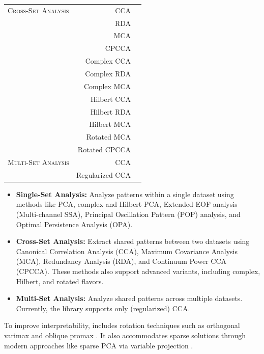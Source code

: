 \begin{table}[t!]
\begin{tabular}{l r c}
        \midrule
        \textsc{Cross-Set Analysis} & CCA & \cite{hotelling_relations_1936,bretherton_intercomparison_1992}  \\ 
        & RDA & \cite{storch_statistical_1999}  \\ 
        & MCA & \cite{bretherton_intercomparison_1992,storch_statistical_1999}  \\ 
        & CPCCA & \cite{swenson_continuum_2015}  \\ 
        & Complex CCA &   \\ 
        & Complex RDA &   \\ 
        & Complex MCA &   \\ 
        & Hilbert CCA &   \\ 
        & Hilbert RDA &   \\ 
        & Hilbert MCA & \cite{elipot_observed_2017}  \\ 
        & Rotated MCA & \cite{cheng_orthogonal_1995}  \\
        & Rotated CPCCA &   \\
        \midrule
        \textsc{Multi-Set Analysis} & CCA & \cite{kettenring_canonical_1971}  \\ 
        & Regularized CCA & \cite{vinod_canonical_1976}  \\ 
        \bottomrule
    \end{tabular}
\end{table}

\begin{itemize}
    \item \textbf{Single-Set Analysis:} Analyze patterns within a single dataset using methods like PCA, complex and Hilbert PCA, Extended EOF analysis (Multi-channel SSA), Principal Oscillation Pattern (POP) analysis, and Optimal Persistence Analysis (OPA).
    \item \textbf{Cross-Set Analysis:} Extract shared patterns between two datasets using Canonical Correlation Analysis (CCA), Maximum Covariance Analysis (MCA), Redundancy Analysis (RDA), and Continuum Power CCA (CPCCA). These methods also support advanced variants, including complex, Hilbert, and rotated flavors.
    \item \textbf{Multi-Set Analysis:} Analyze shared patterns across multiple datasets. Currently, the library supports only (regularized) CCA.
\end{itemize}

To improve interpretability,  includes rotation techniques such as orthogonal varimax \cite{kaiser_varimax_1958} and oblique promax \cite{hendrickson_promax_1964}. It also accommodates sparse solutions through modern approaches like sparse PCA via variable projection \cite{erichson_sparse_2020}.

